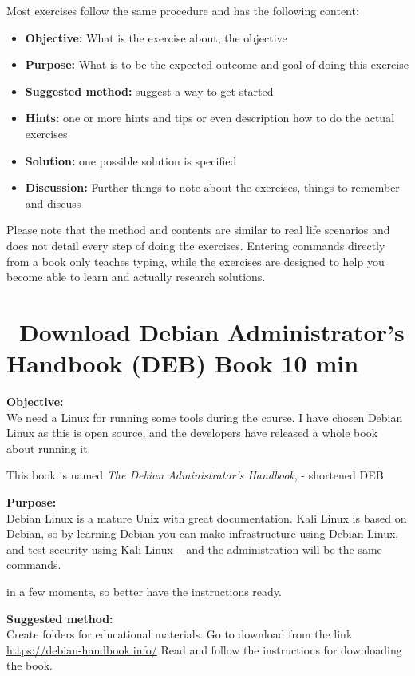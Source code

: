 \documentclass[a4paper,11pt,notitlepage]{report}
\begin{document}
Most exercises follow the same procedure and has the following content:
\begin{itemize}
\item {\bf Objective:} What is the exercise about, the objective
\item {\bf Purpose:} What is to be the expected outcome and goal of doing this exercise
\item {\bf Suggested method:} suggest a way to get started
\item {\bf Hints:} one or more hints and tips or even description how to
do the actual exercises
\item {\bf Solution:} one possible solution is specified
\item {\bf Discussion:} Further things to note about the exercises, things to remember and discuss
\end{itemize}

Please note that the method and contents are similar to real life scenarios and does not detail every step of doing the exercises. Entering commands directly from a book only teaches typing, while the exercises are designed to help you become able to learn and actually research solutions.



\chapter{\faInfoCircle\ Download Debian Administrator’s Handbook (DEB) Book 10 min}
\label{ex:sw-downloadDEB}



{\bf Objective:}\\
We need a Linux for running some tools during the course. I have chosen Debian Linux as this is open source, and the developers have released a whole book about running it.

This book is named
\emph{The Debian Administrator’s Handbook},  - shortened DEB

{\bf Purpose:}\\
Debian Linux is a mature Unix with great documentation. Kali Linux is based on Debian, so by learning Debian you can make infrastructure using Debian Linux, and test security using Kali Linux -- and the administration will be the same commands.

in a few moments, so better have the instructions ready.

{\bf Suggested method:}\\
Create folders for educational materials. Go to download from the link \url{https://debian-handbook.info/}
Read and follow the instructions for downloading the book.
\end{document}
